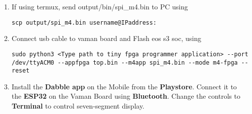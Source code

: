 \begin{enumerate}[label=\thesubsection.\arabic*.,ref=\thesubsection.\theenumi]
\item If using termux, send output/bin/spi{\_}m4.bin to PC using
\begin{lstlisting}
scp output/spi_m4.bin username@IPaddress:
\end{lstlisting}

\item Connect usb cable to vaman board and Flash eos s3 soc, using
\begin{lstlisting}
sudo python3 <Type path to tiny fpga programmer application> --port /dev/ttyACM0 --appfpga top.bin --m4app spi_m4.bin --mode m4-fpga --reset
\end{lstlisting} 

\item Install the \textbf{Dabble app} on the Mobile from the \textbf{Playstore}.
Connect it to the \textbf{ESP32} on the Vaman Board using \textbf{Bluetooth}. 
Change the controls to \textbf{Terminal} to control seven-segment display.
\end{enumerate}